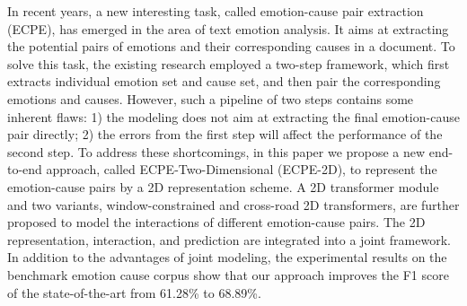In recent years, a new interesting task, called emotion-cause pair extraction (ECPE), has emerged in the area of text emotion analysis. It aims at extracting the potential pairs of emotions and their corresponding causes in a document. To solve this task, the existing research employed a two-step framework, which first extracts individual emotion set and cause set, and then pair the corresponding emotions and causes. However, such a pipeline of two steps contains some inherent flaws: 1) the modeling does not aim at extracting the final emotion-cause pair directly; 2) the errors from the first step will affect the performance of the second step. To address these shortcomings, in this paper we propose a new end-to-end approach, called ECPE-Two-Dimensional (ECPE-2D), to represent the emotion-cause pairs by a 2D representation scheme. A 2D transformer module and two variants, window-constrained and cross-road 2D transformers, are further proposed to model the interactions of different emotion-cause pairs. The 2D representation, interaction, and prediction are integrated into a joint framework. In addition to the advantages of joint modeling, the experimental results on the benchmark emotion cause corpus show that our approach improves the F1 score of the state-of-the-art from 61.28\% to 68.89\%.
